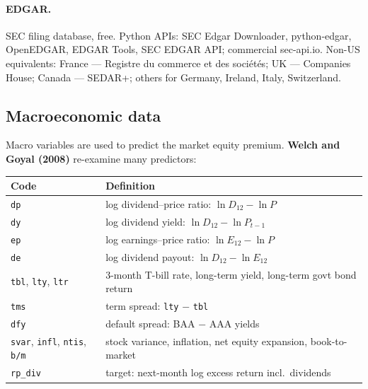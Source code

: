 \documentclass[11pt,a4paper]{report}
\begin{document}
\paragraph{EDGAR.} SEC filing database, free. Python APIs: SEC Edgar Downloader,
python-edgar, OpenEDGAR, EDGAR Tools, SEC EDGAR API; commercial sec-api.io.
Non-US equivalents: France --- Registre du commerce et des soci\'et\'es; UK ---
Companies House; Canada --- SEDAR+; others for Germany, Ireland, Italy, Switzerland.

\subsection{Macroeconomic data}
Macro variables are used to predict the market equity premium.
\textbf{Welch and Goyal (2008)} re-examine many predictors:
\begin{center}
\begin{tabularx}{\textwidth}{@{}lX@{}}
\toprule
Code & Definition \\
\midrule
\texttt{dp} & log dividend--price ratio: $\ln D_{12}-\ln P$ \\
\texttt{dy} & log dividend yield: $\ln D_{12}-\ln P_{t-1}$ \\
\texttt{ep} & log earnings--price ratio: $\ln E_{12}-\ln P$ \\
\texttt{de} & log dividend payout: $\ln D_{12}-\ln E_{12}$ \\
\texttt{tbl}, \texttt{lty}, \texttt{ltr} & 3-month T-bill rate, long-term yield, long-term govt bond return \\
\texttt{tms} & term spread: \texttt{lty} $-$ \texttt{tbl} \\
\texttt{dfy} & default spread: BAA $-$ AAA yields \\
\texttt{svar}, \texttt{infl}, \texttt{ntis}, \texttt{b/m} & stock variance, inflation, net equity expansion, book-to-market \\
\texttt{rp\_div} & target: next-month log excess return incl.\ dividends \\
\bottomrule
\end{tabularx}
\end{center}
\end{document}
